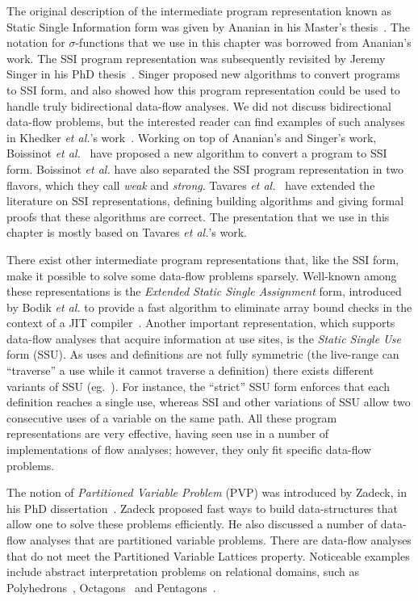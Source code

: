 The original description of the intermediate program representation known as Static Single Information form was given by Ananian in his Master's thesis~\cite{Ananian99}.
The notation for $\sigma$-functions that we use in this chapter was borrowed from Ananian's work.
The SSI program representation was subsequently revisited by Jeremy Singer in his PhD thesis~\cite{Singer06}.
Singer proposed new algorithms to convert programs to SSI form, and also showed how this program representation could be used to handle truly bidirectional data-flow analyses.
We did not discuss bidirectional data-flow problems, but the interested reader can find examples of such analyses in Khedker {\em et al.}'s work~\cite{Khedker99}.
Working on top of Ananian's and Singer's work, Boissinot {\em et al.}~\cite{BoissinotBDR12} have proposed a new algorithm to convert a program to SSI form.
Boissinot {\em et al.} have also separated the SSI program representation in two flavors, which they call {\em weak} and {\em strong}.
Tavares {\em et al.}~\cite{Tavares11b} have extended the literature on SSI representations, defining building algorithms and giving formal proofs that these algorithms are correct.
The presentation that we use in this chapter is mostly based on Tavares {\em et
al.}'s work.

There exist other intermediate program representations that, like the SSI form, make it possible to solve some data-flow problems sparsely.
Well-known among these representations is the {\em Extended Static Single Assignment} form, introduced by Bodik {\em et al.} to provide a fast algorithm to eliminate array bound checks in the context of a JIT compiler~\cite{Bodik00}.
Another important representation, which supports data-flow analyses that acquire information at use sites, is the \emph{Static Single Use} form (SSU).
As uses and definitions are not fully symmetric (the live-range can ``traverse'' a use while it cannot traverse a definition) there exists different variants of SSU (eg.~\cite{Plevyak96,George03-IXP,Lo98_registerPromotion}).
For instance, the ``strict'' SSU form enforces that each definition reaches a
single use, whereas SSI and other variations of SSU allow two consecutive uses
of a variable on the same path.
All these program representations are very effective, having seen use in a number of implementations of flow analyses; however, they only fit specific data-flow problems.

The notion of {\em Partitioned Variable Problem} (PVP) was introduced by Zadeck, in his PhD dissertation~\cite{Zadeck84}.
Zadeck proposed fast ways to build data-structures that allow one to solve these problems efficiently.
He also discussed a number of data-flow analyses that are partitioned variable problems.
There are data-flow analyses that do not meet the Partitioned Variable Lattices property.
Noticeable examples include abstract interpretation problems on relational domains, such as Polyhedrons~\cite{Cousot78}, Octagons~\cite{Mine06} and Pentagons~\cite{Logozzo08}.


